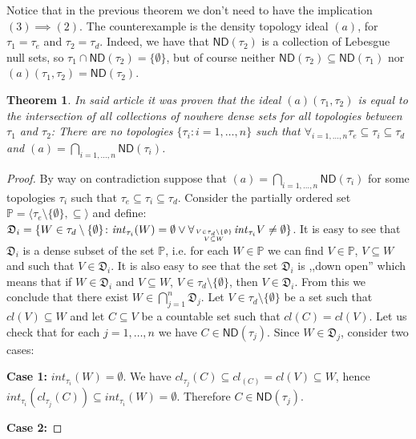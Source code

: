 \documentclass[12pt]{amsart}
\theoremstyle{plain}
\newtheorem{theorem}{Theorem}[section]
\theoremstyle{definition}
\theoremstyle{remark}
\newcommand{\cl}{\mathit{cl}}
\newcommand{\aideal}{\mathit{(a)}}
\newcommand{\ND}{\mathsf{ND}}
\begin{document}
Notice that in the previous theorem we don't need to have
the implication $(3) \implies (2)$. The counterexample 
is the density topology ideal $\aideal$, for $\tau_1 = \tau_e$
and $\tau_2 = \tau_d$. Indeed, we have 
that $\mathsf{ND}(\tau_2)$ is a collection of Lebesgue null sets, 
so $\tau_1 \cap \mathsf{ND}(\tau_2) = \lbrace \emptyset \rbrace$,
but of course neither $\mathsf{ND}(\tau_2) \subseteq \mathsf{ND}(\tau_1)$ 
nor $\aideal(\tau_1, \tau_2) = \mathsf{ND}(\tau_2)$.


\begin{theorem}
In said article it was proven that the ideal $\aideal(\tau_1, \tau_2)$
is equal to the intersection of all collections of nowhere dense sets
for all topologies between $\tau_1$ and $\tau_2$:
There are no topologies $\lbrace \tau_i \colon i = 1,\ldots, n\rbrace$
such that $\forall_{i = 1,\ldots, n} \tau_e \subseteq \tau_i \subseteq \tau_d$
and 
$\aideal = \bigcap_{i=1,\ldots,n} \ND(\tau_i)$.
\end{theorem}

\begin{proof}
By way on contradiction suppose that 
$\aideal = \bigcap_{i=1,\ldots,n} \ND(\tau_i)$ for some topologies 
 $\tau_i$ such that $\tau_e \subseteq \tau_i \subseteq \tau_d$.
Consider the partially ordered set 
$\mathbb{P} = \langle \tau_e\setminus\lbrace\emptyset\rbrace, \subseteq\rangle$
and define:
$\mathfrak{D}_i = \lbrace W \in \tau_d\setminus\lbrace\emptyset\rbrace \colon
\mathit{int}_{\tau_i}(W) = \emptyset \vee \forall_{V \in \tau_d\setminus\lbrace\emptyset\rbrace \atop V \subseteq W} \mathit{int}_{\tau_i} V \not= \emptyset\rbrace$.
It is easy to see that $\mathfrak{D}_i$ is a dense subset of 
the set $\mathbb{P}$, i.e. for each $W \in \mathbb{P}$ we can find
$V \in \mathbb{P}$, $V \subseteq W$ and such that $V \in \mathfrak{D}_i$. It is also
easy to see that the set 
$\mathfrak{D}_i$ is ,,down open'' which means that if
$W \in \mathfrak{D}_i$ and 
$V \subseteq W$, $V\in\tau_d\setminus\lbrace\emptyset\rbrace$, then $V \in \mathfrak{D}_i$. From this we conclude that there exist $W \in \bigcap_{j=1}^n \mathfrak{D}_j$. Let
$V \in \tau_d\setminus\lbrace\emptyset\rbrace$ be a set such that 
$\cl(V) \subseteq W$ and let $C \subseteq V$ be a countable set
such that $\cl(C) = \cl(V)$. Let us check that for each $j = 1,\ldots,n$
we have $C \in \ND(\tau_j)$. 
Since $W \in \mathfrak{D}_j$, consider two cases:

{\bf Case 1:} $\mathit{int}_{\tau_i}(W) = \emptyset$.
We have $\cl_{\tau_j}(C) \subseteq \cl_(C) = \cl(V) \subseteq W$, hence
$\mathit{int}_{\tau_i}(\cl_{\tau_j}(C)) \subseteq \mathit{int}_{\tau_i}(W) = \emptyset$.
Therefore $C \in \ND(\tau_j)$.

{\bf Case 2:}

\end{proof}
\end{document}
